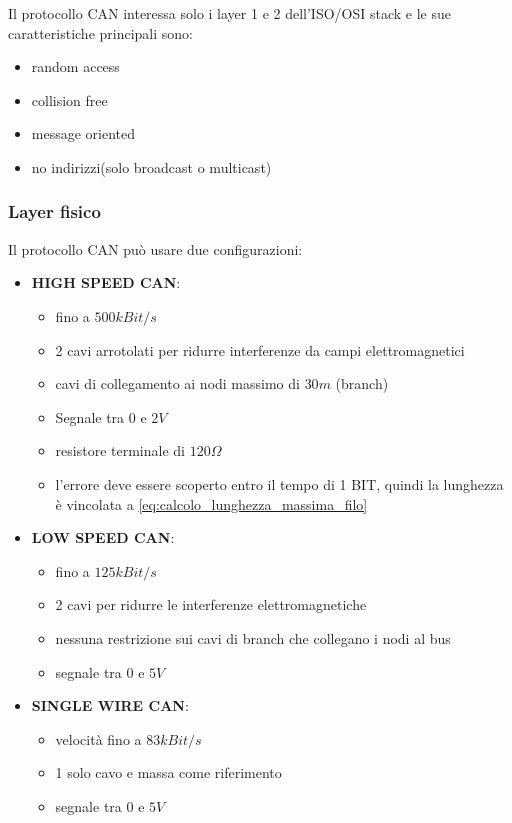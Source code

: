 Il protocollo CAN interessa solo i layer 1 e 2 dell'ISO/OSI stack e le sue caratteristiche principali sono:
\begin{itemize}
  \item random access
  \item collision free
  \item message oriented
  \item no indirizzi(solo broadcast o multicast)
\end{itemize}


\subsubsection{Layer fisico}
Il protocollo CAN può usare due configurazioni:
\begin{itemize}
  \item \textbf{HIGH SPEED CAN}:
    \begin{itemize}
      \item fino a $500kBit/s$
      \item 2 cavi arrotolati per ridurre interferenze da campi elettromagnetici
      \item cavi di collegamento ai nodi massimo di $30m$ (branch)
      \item Segnale tra $0$ e $2V$
      \item resistore terminale di $120\Omega $
      \item l'errore deve essere scoperto entro il tempo di 1 BIT, quindi la lunghezza è vincolata a \autoref{eq:calcolo_lunghezza_massima_filo}
    \end{itemize}
  \item \textbf{LOW SPEED CAN}:
    \begin{itemize}
      \item fino a $125kBit/s$
      \item 2 cavi per ridurre le interferenze elettromagnetiche
      \item nessuna restrizione sui cavi di branch che collegano i nodi al bus
      \item segnale tra $0$ e $5V$
    \end{itemize}
  \item \textbf{SINGLE WIRE CAN}:
    \begin{itemize}
      \item velocità fino a $83kBit/s$
      \item 1 solo cavo e massa come riferimento
      \item segnale tra $0$ e $5V$
    \end{itemize}
\end{itemize}



